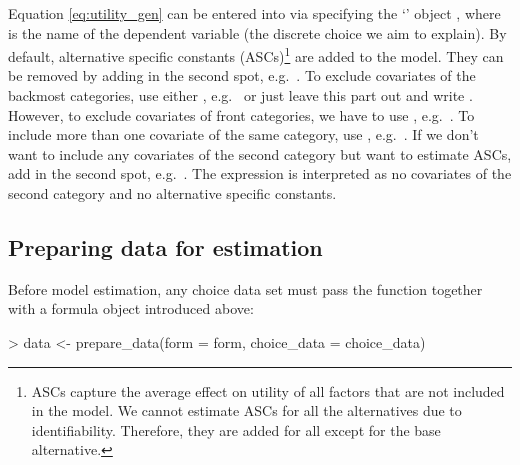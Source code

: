 \documentclass[article]{jss}
\newcommand{\class}[1]{`\code{#1}'}
\newcommand{\fct}[1]{\code{#1()}}
\begin{document}
Equation \eqref{eq:utility_gen} can be entered into  via specifying the \class{formula} object , where  is the name of the dependent variable (the discrete choice we aim to explain). By default, alternative specific constants (ASCs)\footnote{ASCs capture the average effect on utility of all factors that are not included in the model. We cannot estimate ASCs for all the alternatives due to identifiability. Therefore, they are added for all except for the base alternative.} are added to the model. They can be removed by adding  in the second spot, e.g.\ . To exclude covariates of the backmost categories, use either , e.g.\  or just leave this part out and write . However, to exclude covariates of front categories, we have to use , e.g.\ . To include more than one covariate of the same category, use \code{+}, e.g.\ . If we don't want to include any covariates of the second category but want to estimate ASCs, add  in the second spot, e.g.\ . The expression  is interpreted as no covariates of the second category and no alternative specific constants.

\subsection{Preparing data for estimation} \label{subsec:prepare_data}

Before model estimation, any choice data set  must pass the \fct{prepare\_data} function together with a formula object  introduced above:

\begin{Schunk}
\begin{Sinput}
> data <- prepare_data(form = form, choice_data = choice_data)
\end{Sinput}
\end{Schunk}
\end{document}
